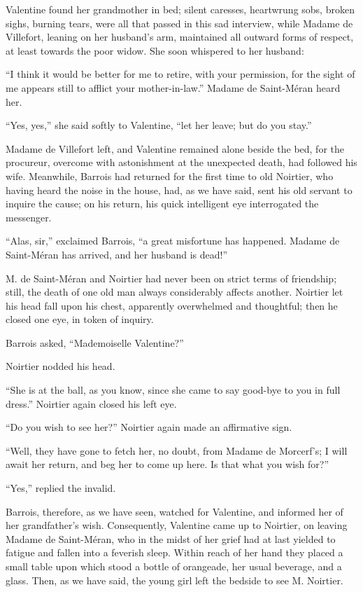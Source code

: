 Valentine found her grandmother in bed; silent caresses, heartwrung
sobs, broken sighs, burning tears, were all that passed in this sad
interview, while Madame de Villefort, leaning on her husband’s arm,
maintained all outward forms of respect, at least towards the poor
widow. She soon whispered to her husband:

“I think it would be better for me to retire, with your permission, for
the sight of me appears still to afflict your mother-in-law.” Madame de
Saint-Méran heard her.

“Yes, yes,” she said softly to Valentine, “let her leave; but do you
stay.”

Madame de Villefort left, and Valentine remained alone beside the bed,
for the procureur, overcome with astonishment at the unexpected death,
had followed his wife. Meanwhile, Barrois had returned for the first
time to old Noirtier, who having heard the noise in the house, had, as
we have said, sent his old servant to inquire the cause; on his return,
his quick intelligent eye interrogated the messenger.

“Alas, sir,” exclaimed Barrois, “a great misfortune has happened.
Madame de Saint-Méran has arrived, and her husband is dead!”

M. de Saint-Méran and Noirtier had never been on strict terms of
friendship; still, the death of one old man always considerably affects
another. Noirtier let his head fall upon his chest, apparently
overwhelmed and thoughtful; then he closed one eye, in token of
inquiry.

Barrois asked, “Mademoiselle Valentine?”

Noirtier nodded his head.

“She is at the ball, as you know, since she came to say good-bye to you
in full dress.” Noirtier again closed his left eye.

“Do you wish to see her?” Noirtier again made an affirmative sign.

“Well, they have gone to fetch her, no doubt, from Madame de Morcerf’s;
I will await her return, and beg her to come up here. Is that what you
wish for?”

“Yes,” replied the invalid.

Barrois, therefore, as we have seen, watched for Valentine, and
informed her of her grandfather’s wish. Consequently, Valentine came up
to Noirtier, on leaving Madame de Saint-Méran, who in the midst of her
grief had at last yielded to fatigue and fallen into a feverish sleep.
Within reach of her hand they placed a small table upon which stood a
bottle of orangeade, her usual beverage, and a glass. Then, as we have
said, the young girl left the bedside to see M. Noirtier.

